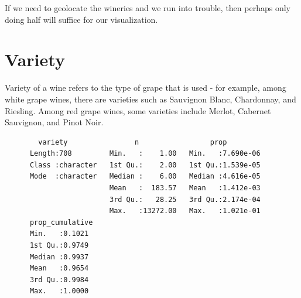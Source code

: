 \documentclass[12pt,twoside]{amherstthesis}
\newenvironment{Shaded}{\begin{snugshade}}{\end{snugshade}}
\newcommand{\KeywordTok}[1]{\textcolor[rgb]{0.13,0.29,0.53}{\textbf{#1}}}
\newcommand{\DataTypeTok}[1]{\textcolor[rgb]{0.13,0.29,0.53}{#1}}
\newcommand{\StringTok}[1]{\textcolor[rgb]{0.31,0.60,0.02}{#1}}
\newcommand{\OtherTok}[1]{\textcolor[rgb]{0.56,0.35,0.01}{#1}}
\newcommand{\OperatorTok}[1]{\textcolor[rgb]{0.81,0.36,0.00}{\textbf{#1}}}
\newcommand{\NormalTok}[1]{#1}
\begin{document}
If we need to geolocate the wineries and we run into trouble, then
perhaps only doing half will suffice for our visualization.

\section{Variety}\label{variety}

Variety of a wine refers to the type of grape that is used - for
example, among white grape wines, there are varieties such as Sauvignon
Blanc, Chardonnay, and Riesling. Among red grape wines, some varieties
include Merlot, Cabernet Sauvignon, and Pinot Noir.
\begin{Shaded}
\end{Shaded}
\begin{verbatim}
        variety                n                 prop          
      Length:708         Min.   :    1.00   Min.   :7.690e-06  
      Class :character   1st Qu.:    2.00   1st Qu.:1.539e-05  
      Mode  :character   Median :    6.00   Median :4.616e-05  
                         Mean   :  183.57   Mean   :1.412e-03  
                         3rd Qu.:   28.25   3rd Qu.:2.174e-04  
                         Max.   :13272.00   Max.   :1.021e-01  
      prop_cumulative 
      Min.   :0.1021  
      1st Qu.:0.9749  
      Median :0.9937  
      Mean   :0.9654  
      3rd Qu.:0.9984  
      Max.   :1.0000
\end{verbatim}
\begin{Shaded}
\end{Shaded}
\end{document}
